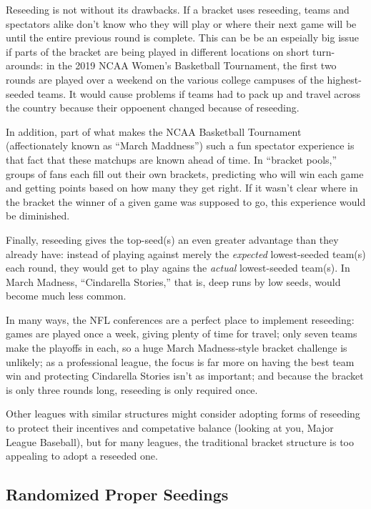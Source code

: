 \documentclass[../main.tex]{subfiles}
\begin{document}
Reseeding is not without its drawbacks. If a bracket uses reseeding, teams and spectators alike don't know who they will play or where their next game will be until the entire previous round is complete. This can be be an espeially big issue if parts of the bracket are being played in different locations on short turn-arounds: in the 2019 NCAA Women's Basketball Tournament, the first two rounds are played over a weekend on the various college campuses of the highest-seeded teams. It would cause problems if teams had to pack up and travel across the country because their oppoenent changed because of reseeding.

In addition, part of what makes the NCAA Basketball Tournament (affectionately known as ``March Maddness'') such a fun spectator experience is that fact that these matchups are known ahead of time. In ``bracket pools,'' groups of fans each fill out their own brackets, predicting who will win each game and getting points based on how many they get right. If it wasn't clear where in the bracket the winner of a given game was supposed to go, this experience would be diminished.

Finally, reseeding gives the top-seed(s) an even greater advantage than they already have: instead of playing against merely the \textit{expected} lowest-seeded team(s) each round, they would get to play agains the \textit{actual} lowest-seeded team(s). In March Madness, ``Cindarella Stories,'' that is, deep runs by low seeds, would become much less common.

In many ways, the NFL conferences are a perfect place to implement reseeding: games are played once a week, giving plenty of time for travel; only seven teams make the playoffs in each, so a huge March Madness-style bracket challenge is unlikely; as a professional league, the focus is far more on having the best team win and protecting Cindarella Stories isn't as important; and because the bracket is only three rounds long, reseeding is only required once.

Other leagues with similar structures might consider adopting forms of reseeding to protect their incentives and competative balance (looking at you, Major League Baseball), but for many leagues, the traditional bracket structure is too appealing to adopt a reseeded one.

\subsection{Randomized Proper Seedings}
\end{document}
